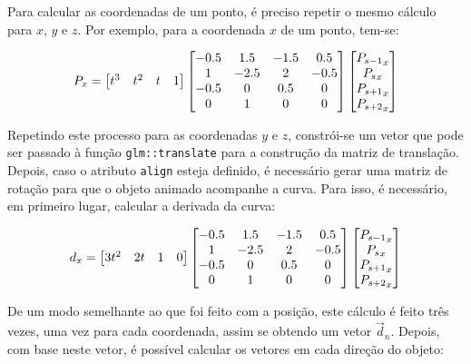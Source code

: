 \documentclass[12pt, a4paper]{article}
\begin{document}
Para calcular as coordenadas de um ponto, é preciso repetir o mesmo cálculo para $x$, $y$ e $z$. Por
exemplo, para a coordenada $x$ de um ponto, tem-se:

$$
\def\arraystretch{1}
P_x =
\begin{bmatrix} t^3 & t^2 & t & 1 \end{bmatrix}
\begin{bmatrix}
    -0.5 &  1.5 & -1.5 &  0.5 \\
       1 & -2.5 &    2 & -0.5 \\
    -0.5 &    0 &  0.5 &    0 \\
       0 &    1 &    0 &    0
\end{bmatrix}
\begin{bmatrix} {P_{s - 1}}_x \\ {P_{s}}_x \\ {P_{s + 1}}_x \\ {P_{s + 2}}_x \end{bmatrix}
$$

Repetindo este processo para as coordenadas $y$ e $z$, constrói-se um vetor que pode ser passado à
função \texttt{glm::translate} para a construção da matriz de translação. Depois, caso o atributo
\texttt{align} esteja definido, é necessário gerar uma matriz de rotação para que o objeto animado
acompanhe a curva. Para isso, é necessário, em primeiro lugar, calcular a derivada da curva:

$$
\def\arraystretch{1}
d_x =
\begin{bmatrix} 3 t^2 & 2 t & 1 & 0 \end{bmatrix}
\begin{bmatrix}
    -0.5 &  1.5 & -1.5 &  0.5 \\
       1 & -2.5 &    2 & -0.5 \\
    -0.5 &    0 &  0.5 &    0 \\
       0 &    1 &    0 &    0
\end{bmatrix}
\begin{bmatrix} {P_{s - 1}}_x \\ {P_{s}}_x \\ {P_{s + 1}}_x \\ {P_{s + 2}}_x \end{bmatrix}
$$

De um modo semelhante ao que foi feito com a posição, este cálculo é feito três vezes, uma vez para
cada coordenada, assim se obtendo um vetor $\vec{d}_n$. Depois, com base neste vetor, é possível
calcular os vetores em cada direção do objeto:
\end{document}
